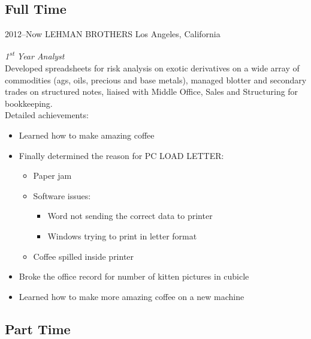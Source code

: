 \documentclass[a4paper]{cv-friggeri-k}
\begin{document}
\subsection{Full Time}

\begin{entrylist}


\entry
{2012--Now}
{LEHMAN BROTHERS}
{Los Angeles, California}
{\emph{1\textsuperscript{st} Year Analyst} \\
Developed spreadsheets for risk analysis on exotic derivatives on a wide array of commodities (ags, oils, precious and base metals), managed blotter and secondary trades on structured notes, liaised with Middle Office, Sales and Structuring for bookkeeping. \\
Detailed achievements:
\begin{itemize}
\item Learned how to make amazing coffee
\item Finally determined the reason for \textsc{PC LOAD LETTER}:
\begin{itemize}
\item Paper jam
\item Software issues:
\begin{itemize}
\item Word not sending the correct data to printer
\item Windows trying to print in letter format
\end{itemize}
\item Coffee spilled inside printer
\end{itemize}
\item Broke the office record for number of kitten pictures in cubicle
\item Learned how to make more amazing coffee on a new machine
\end{itemize}}


\end{entrylist}

\subsection{Part Time}
\end{document}

